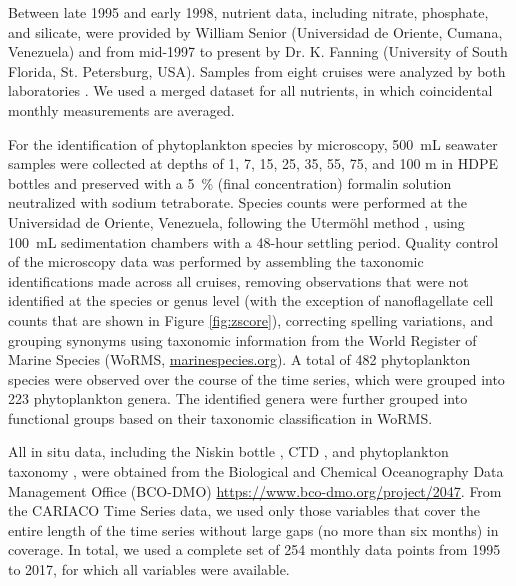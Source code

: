 \documentclass[draft]{agujournal2019}
\begin{document}
    Between late 1995 and early 1998, nutrient data, including nitrate, phosphate, and silicate, were provided by William Senior (Universidad de Oriente, Cumana, Venezuela) and from mid-1997 to present by Dr. K. Fanning (University of South Florida, St. Petersburg, USA). Samples from eight cruises were analyzed by both laboratories \cite{taylor_ecosystem_2012}. We used a merged dataset for all nutrients, in which coincidental monthly measurements are averaged.
       
    For the identification of phytoplankton species by microscopy, \qty{500}{\milli\liter} seawater samples were collected at depths of 1, 7, 15, 25, 35, 55, 75, and 100 m in HDPE bottles and preserved with a \qty{5}{\%} (final concentration) formalin solution neutralized with sodium tetraborate. Species counts were performed at the Universidad de Oriente, Venezuela, following the Utermöhl method \cite{hasle1978inverted}, using \qty{100}{\milli\liter} sedimentation chambers with a 48-hour settling period. 
    Quality control of the microscopy data was performed by assembling the taxonomic identifications made across all cruises, removing observations that were not identified at the species or genus level (with the exception of nanoflagellate cell counts that are shown in Figure \ref{fig:zscore}), correcting spelling variations, and grouping synonyms using taxonomic information from the World Register of Marine Species (WoRMS, \url{marinespecies.org}). A total of 482 phytoplankton species were observed over the course of the time series, which were grouped into 223 phytoplankton genera. The identified genera were further grouped into functional groups based on their taxonomic classification in WoRMS.

    
    All in situ data, including the Niskin bottle \cite{mullerkarger2019niskin}, CTD \cite{mullerkarger2019ctd}, and phytoplankton taxonomy \cite{troccoli2019phytoplankton}, were obtained from the Biological and Chemical Oceanography Data Management Office (BCO-DMO) \url{https://www.bco-dmo.org/project/2047}. 
    From the CARIACO Time Series data, we used only those variables that cover the entire length of the time series without large gaps (no more than six months) in coverage. In total, we used a complete set of 254 monthly data points from 1995 to 2017, for which all variables were available.
\end{document}
